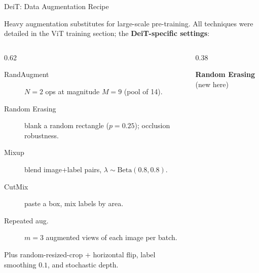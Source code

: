 \begin{frame}{DeiT: Data Augmentation Recipe}

  Heavy augmentation substitutes for large-scale pre-training. All techniques were detailed in the ViT training section; the \textbf{DeiT-specific settings}:

  \vspace{0.4em}
  \begin{columns}[c]
    \begin{column}{0.62\textwidth}
      \begin{description}
        \item[RandAugment] \cite{cubuk2020randaugment} $N{=}2$ ops at magnitude $M{=}9$ (pool of 14).
        \item[Random Erasing] \cite{zhong2020randomerasing} blank a random rectangle ($p{=}0.25$); occlusion robustness.
        \item[Mixup] \cite{zhang2018mixup} blend image+label pairs, $\lambda\sim\mathrm{Beta}(0.8,0.8)$.
        \item[CutMix] \cite{yun2019cutmix} paste a box, mix labels by area.
        \item[Repeated aug.] \cite{hoffer2020augment} $m{=}3$ augmented views of each image per batch.
      \end{description}
      \vspace{0.3em}
      {\footnotesize Plus random-resized-crop $+$ horizontal flip, label smoothing $0.1$, and stochastic depth.}
    \end{column}
    \begin{column}{0.38\textwidth}
      \begin{center}
        {\footnotesize \textbf{Random Erasing} (new here)}\\[0.5em]
      \end{center}
    \end{column}
  \end{columns}
\end{frame}


